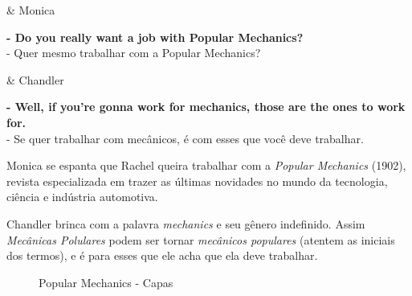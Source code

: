 \begin{tcolorbox}[enhanced,center upper,
    drop fuzzy shadow southeast, boxrule=0.3pt,
    lower separated=false, breakable,
    colframe=black!30!dialogoBorder,colback=white]
\begin{minipage}[c]{0.16\linewidth}
   & \centering \scriptsize{Monica}
\end{minipage}
\hfill
\begin{minipage}[c]{0.8\linewidth}
  \textbf{- Do you really want a job with Popular Mechanics?}\\
  - Quer mesmo trabalhar com a Popular Mechanics?
\end{minipage}

\medskip
\begin{minipage}[c]{0.16\linewidth}
   & \centering \scriptsize{Chandler}
\end{minipage}
\hfill
\begin{minipage}[c]{0.8\linewidth}
  \textbf{- Well, if you're gonna work for mechanics, those are the ones to work for.}\\
  - Se quer trabalhar com mecânicos, é com esses que você deve trabalhar.
\end{minipage}
\end{tcolorbox}

Monica se espanta que Rachel queira trabalhar com a \emph{Popular
Mechanics} (1902), revista especializada em trazer as últimas novidades
no mundo da tecnologia, ciência e indústria automotiva.

Chandler brinca com a palavra \emph{mechanics} e seu gênero indefinido.
Assim \emph{Mecânicas Polulares} podem ser tornar \emph{mecânicos
populares} (atentem as iniciais dos termos), e é para esses que ele acha
que ela deve trabalhar.

\begin{figure}
  \centering
    \caption{Popular Mechanics - Capas\label{fig:popular-mechanics-capas}}
\end{figure}

